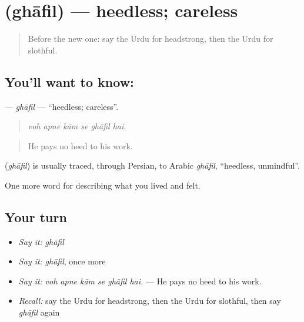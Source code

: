 \section[\texorpdfstring{\ur{غافل} (ghāfil)}{غافل (ghāfil)}]{ (ghāfil) — heedless; careless}

\label{lesson:UR-C455-ghafil}



\begin{quote}
Before the new one: say the Urdu for headstrong, then the Urdu for slothful.
\end{quote}

\subsection*{You'll want to know: }
\textbf{} — \emph{ghāfil} — \textquotedblleft{}heedless; careless\textquotedblright{}.

\begin{quote}
     
\end{quote}

\begin{quote}
\emph{voh apne kām se ghāfil hai.}
\end{quote}

\begin{quote}
He pays no heed to his work.
\end{quote}

\begin{cousinweb}
\textbf{} (\emph{ghāfil}) is usually traced, through Persian, to Arabic \emph{ghāfil}, \textquotedblleft{}heedless, unmindful\textquotedblright{}.
\end{cousinweb}

\begin{grammarlens}[title={What you've built}]
One more word for describing what you lived and felt.
\end{grammarlens}

\subsection*{Your turn}
\begin{itemize}
\raggedright
  \item \emph{Say it:} \emph{ghāfil}
  \item \emph{Say it:} \emph{ghāfil}, once more
  \item \emph{Say it:} \emph{voh apne kām se ghāfil hai.} — He pays no heed to his work.
  \item \emph{Recall:} say the Urdu for headstrong, then the Urdu for slothful, then say \emph{ghāfil} again
\end{itemize}

